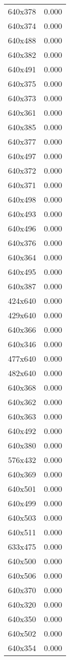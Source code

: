 \begin{table}
\begin{tabular}{lr}
640x378 & 0.000 \\
640x374 & 0.000 \\
640x488 & 0.000 \\
640x382 & 0.000 \\
640x491 & 0.000 \\
640x375 & 0.000 \\
640x373 & 0.000 \\
640x361 & 0.000 \\
640x385 & 0.000 \\
640x377 & 0.000 \\
640x497 & 0.000 \\
640x372 & 0.000 \\
640x371 & 0.000 \\
640x498 & 0.000 \\
640x493 & 0.000 \\
640x496 & 0.000 \\
640x376 & 0.000 \\
640x364 & 0.000 \\
640x495 & 0.000 \\
640x387 & 0.000 \\
424x640 & 0.000 \\
429x640 & 0.000 \\
640x366 & 0.000 \\
640x346 & 0.000 \\
477x640 & 0.000 \\
482x640 & 0.000 \\
640x368 & 0.000 \\
640x362 & 0.000 \\
640x363 & 0.000 \\
640x492 & 0.000 \\
640x380 & 0.000 \\
576x432 & 0.000 \\
640x369 & 0.000 \\
640x501 & 0.000 \\
640x499 & 0.000 \\
640x503 & 0.000 \\
640x511 & 0.000 \\
633x475 & 0.000 \\
640x500 & 0.000 \\
640x506 & 0.000 \\
640x370 & 0.000 \\
640x320 & 0.000 \\
640x350 & 0.000 \\
640x502 & 0.000 \\
640x354 & 0.000 \\

\end{tabular}
\end{table}
